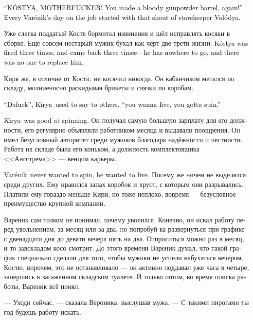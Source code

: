 \documentclass[a5paper,12pt,fleqn]{extbook}\usepackage{cooltooltips}\usepackage{polyglossia}\setdefaultlanguage[babelshorthands=true]{russian}\setotherlanguage{english}\defaultfontfeatures{Ligatures=TeX,Mapping=tex-text} \usepackage{xcolor}\definecolor{lightgray}{HTML}{bbbbbb}\color{lightgray}\newcommand{\ml}[3]{\textenglish{\textcolor{black}{#3}}}
\newcommand{\Varenik}{Var\'enik}
\newcommand{\Kirya}{K\'{\i}rya}
\newcommand{\Volodya}{Vol\'odya}
\begin{document}
\ml{$0$}
{--- КОООСТЯ, БЛЯЯЯ!}
{``K\'OSTYA, MOTHERFUCKER!}
\ml{$0$}
{Опять ты мне, сука, собрал бочку с порохом! --- с этого крика кладовщика Володи начинался рабочий день Вареника.}
{You made a bloody gunpowder barrel, again!'' Every \Varenik's day on the job started with that shout of storekeeper \Volodya.}

Уже слегка поддатый Костя бормотал извинения и шёл исправлять косяки в сборке.
Ещё совсем нестарый мужик бухал как чёрт две трети жизни.
\ml{$0$}
{Костю увольняли три раза, и три раза он возвращался --- идти ему было некуда, и заменить его было некем.}
{K\'ostya was fired three times, and came back three times---he has nowhere to go, and there was no one to replace him.}

Киря же, в отличие от Кости, не косячил никогда.
Он кабанчиком метался по складу, молниеносно раскидывая брикеты и связки по коробам.

\ml{$0$}
{--- Ну а хуле, --- говорил Киря прочим, --- хочешь жить --- умей вертеться.}
{``Dafuck'', \Kirya\ used to say to others, ``you wanna live, you gotta spin.''}

\ml{$0$}
{Киря замечательно умел вертеться.}
{\Kirya\ was good at spinning.}
Он получал самую большую зарплату для его должности, его регулярно объявляли работником месяца и выдавали поощрения.
Он имел безусловный авторитет среди мужиков благодаря надёжности и честности.
Работа на складе была его коньком, а должность комплектовщика <<Ангстрема>> --- венцом карьеры.

\ml{$0$}
{Вареник не хотел вертеться --- он хотел жить.}
{\Varenik\ never wanted to spin, he wanted to live.}
Посему же ничем не выделялся среди других.
Ему нравился запах коробок и хруст, с которым они разрывались.
Платили ему гораздо меньше Кири, но тоже неплохо, вовремя --- безусловное преимущество крупной компании.

Вареник сам толком не понимал, почему уволился.
Конечно, он искал работу перед увольнением, за месяц или за два, но попробуй-ка развернуться при графике с двенадцати дня до девяти вечера пять на два.
Отпроситься можно раз в месяц, и то завскладом косо смотрит.
До этого времени Вареник думал, что такой график специально сделали для того, чтобы мужики не успели набухаться вечером.
Костю, впрочем, это не останавливало --- он активно поддавал уже часа в четыре, запершись в загаженном складском туалете.
И только потом, во время поиска работы, Вареник всё понял.

--- Уходи сейчас, --- сказала Вероника, выслушав мужа.
--- С такими пирогами ты год будешь работу искать.
\end{document}
